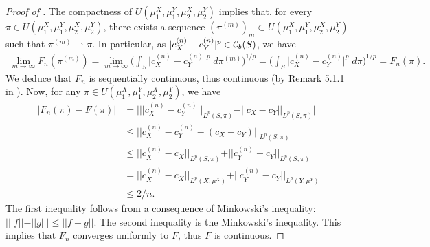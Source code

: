 \begin{proof}[Proof of ]
  The compactness of $U(\mu_1^X, \mu_1^Y, \mu_2^X, \mu_2^Y)$ implies that, for every
  $\pi \in U(\mu_1^X, \mu_1^Y, \mu_2^X, \mu_2^Y)$,
  there exists a sequence $(\pi^{(m)})_m \subset U(\mu_1^X, \mu_1^Y, \mu_2^X, \mu_2^Y)$ such that
  $\pi^{(m)} \rightharpoonup \pi$. In particular, as
  $\vert c_X^{(n)} - c_Y^{(n)} \vert^p \in \mathcal C_b(S)$, we have
  \begin{equation}
    \begin{split}
      \lim_{m \to \infty} F_n(\pi^{(m)}) =
      \lim_{m \to \infty} \Big( \int_{S} \vert c_X^{(n)} - c_Y^{(n)} \vert^p \;
      d\pi^{(m)} \Big)^{1/p}
      = \Big( \int_{S} \vert c_X^{(n)} - c_Y^{(n)} \vert^p \; d\pi \Big)^{1/p} = F_n(\pi).
    \end{split}
  \end{equation}
  We deduce that $F_n$ is sequentially continuous, thus continuous
  (by Remark 5.1.1 in \citep{Ambrosio05}).
  Now, for any $\pi \in U(\mu_1^X, \mu_1^Y, \mu_2^X, \mu_2^Y)$, we have
  \begin{equation}
    \begin{split}
      \vert F_n(\pi) - F(\pi) \vert &=
      \Big\vert \vert\vert c_X^{(n)} - c_Y^{(n)} \vert\vert_{L^p(S, \pi)}
      - \vert\vert c_X - c_Y \vert\vert_{L^p(S, \pi)} \Big\vert \\
      &\leq \vert\vert c_X^{(n)} - c_Y^{(n)} - (c_X - c_Y) \vert\vert_{L^p(S, \pi)} \\
      &\leq \vert\vert c_X^{(n)} - c_X \vert\vert_{L^p(S, \pi)} +
      \vert\vert c_Y^{(n)} - c_Y \vert\vert_{L^p(S, \pi)} \\
      &= \vert\vert c_X^{(n)} - c_X \vert\vert_{L^p(X, \mu^X)} +
      \vert\vert c_Y^{(n)} - c_Y \vert\vert_{L^p(Y, \mu^Y)} \\
      &\leq 2/n.
    \end{split}
  \end{equation}
  The first inequality follows from a consequence of Minkowski's inequality:
  $ \Big\vert \vert\vert f \vert\vert - \vert\vert g \vert\vert \Big\vert
  \leq \vert\vert f-g \vert\vert$. The second inequality is the Minkowski's inequality.
  This implies that $F_n$ converges uniformly to $F$, thus $F$ is continuous.
\end{proof}

